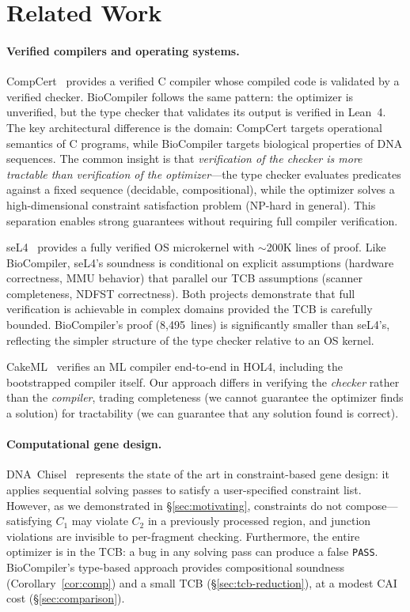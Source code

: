 \FloatBarrier
\section{Related Work}\label{sec:related}

\paragraph{Verified compilers and operating systems.}
CompCert~\cite{leroy2009compcert} provides a verified C compiler whose
compiled code is validated by a verified checker.  BioCompiler follows
the same pattern: the optimizer is unverified, but the type checker that
validates its output is verified in Lean~4.  The key architectural
difference is the domain: CompCert targets operational semantics of C
programs, while BioCompiler targets biological properties of DNA
sequences.  The common insight is that \emph{verification of the checker
is more tractable than verification of the optimizer}---the type checker
evaluates predicates against a fixed sequence (decidable, compositional),
while the optimizer solves a high-dimensional constraint satisfaction
problem (NP-hard in general).  This separation enables strong guarantees
without requiring full compiler verification.

seL4~\cite{klein2014sel4} provides a fully verified OS microkernel with
$\sim$200K lines of proof.  Like BioCompiler, seL4's soundness is
conditional on explicit assumptions (hardware correctness, MMU behavior)
that parallel our TCB assumptions (scanner completeness, NDFST
correctness).  Both projects demonstrate that full verification is
achievable in complex domains provided the TCB is carefully bounded.
BioCompiler's proof (8,495~lines) is significantly smaller than seL4's,
reflecting the simpler structure of the type checker relative to an OS
kernel.

CakeML~\cite{kumar2014cakeml} verifies an ML compiler end-to-end in
HOL4, including the bootstrapped compiler itself.  Our approach differs
in verifying the \emph{checker} rather than the \emph{compiler}, trading
completeness (we cannot guarantee the optimizer finds a solution) for
tractability (we can guarantee that any solution found is correct).

\paragraph{Computational gene design.}
DNA~Chisel~\cite{piret2020dnachisel} represents the state of the art in
constraint-based gene design: it applies sequential solving passes to
satisfy a user-specified constraint list.  However, as we demonstrated
in \S\ref{sec:motivating}, constraints do not compose---satisfying $C_1$
may violate $C_2$ in a previously processed region, and junction
violations are invisible to per-fragment checking.  Furthermore, the
entire optimizer is in the TCB: a bug in any solving pass can produce a
false \texttt{PASS}.  BioCompiler's type-based approach provides
compositional soundness (Corollary~\ref{cor:comp}) and a small TCB
(\S\ref{sec:tcb-reduction}), at a modest CAI cost (\S\ref{sec:comparison}).

